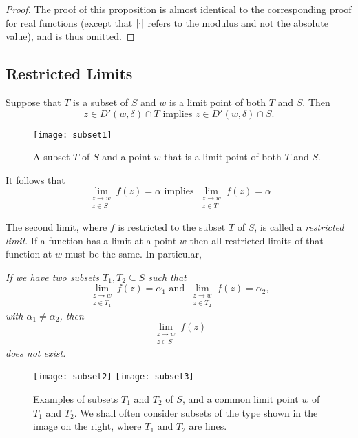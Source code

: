 \begin{proof}
The proof of this proposition is almost identical to the corresponding proof for real functions (except that $\left| \cdot \right|$ refers to the modulus and not the absolute value), and is thus omitted.
\end{proof}


\subsection{Restricted Limits}

Suppose that $T$ is a subset of $S$ and $w$ is a limit point of both $T$ and $S$.  Then 
\[
 z \in D'(w, \delta) \cap T \text{ implies } z \in D' (w,\delta) \cap S.
\]
\begin{figure}[h]
\centering
\texttt{[image: subset1]}
\caption{A subset $T$ of $S$ and a point $w$ that is a limit point of both $T$ and $S$.}
\end{figure}


It follows that
\[
 \lim_{\substack{z \to w \\ z \in S}} f(z) = \alpha \text{ implies }  \lim_{\substack{z \to w \\ z \in T}} f(z) = \alpha
\]

The second limit, where $f$ is restricted to the subset $T$ of $S$, is called a \emph{restricted limit}.   If a function has a limit at a point $w$ then all restricted limits of that function at $w$ must be the same.   In particular, 

\emph{If we have two subsets $T_1,T_2 \subseteq S$ such that 
\[
 \lim_{\substack{z \to w \\ z \in T_1}} f(z) = \alpha_1 \text{ and } \lim_{\substack{z \to w \\ z \in T_2}} f(z) = \alpha_2,
\]
with $\alpha_1 \neq \alpha_2$, then
\[
\lim_{\substack{z \to w \\ z \in S}} f(z)
\]
does not exist.
}



\begin{figure}[h]
\centering
\texttt{[image: subset2]}\quad
\texttt{[image: subset3]}
\caption{Examples of subsets $T_1$ and $T_2$ of $S$, and a common limit point $w$ of $T_1$ and $T_2$.  We shall often consider subsets of the type shown in the image on the right, where $T_1$ and $T_2$ are lines.}
\end{figure}



